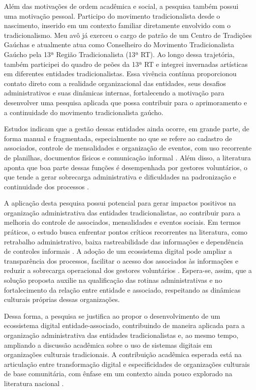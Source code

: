 ﻿\documentclass[12pt,a4paper]{article}
\begin{document}
Além das motivações de ordem acadêmica e social, a pesquisa também possui uma motivação pessoal. Participo do movimento tradicionalista desde o nascimento, inserido em um contexto familiar diretamente envolvido com o tradicionalismo. Meu avô já exerceu o cargo de patrão de um Centro de Tradições Gaúchas e atualmente atua como Conselheiro do Movimento Tradicionalista Gaúcho pela 13ª Região Tradicionalista (13ª RT). Ao longo dessa trajetória, também participei do quadro de peões da 13ª RT e integrei invernadas artísticas em diferentes entidades tradicionalistas. Essa vivência contínua proporcionou contato direto com a realidade organizacional das entidades, seus desafios administrativos e suas dinâmicas internas, fortalecendo a motivação para desenvolver uma pesquisa aplicada que possa contribuir para o aprimoramento e a continuidade do movimento tradicionalista gaúcho.

Estudos indicam que a gestão dessas entidades ainda ocorre, em grande parte, de forma manual e fragmentada, especialmente no que se refere ao cadastro de associados, controle de mensalidades e organização de eventos, com uso recorrente de planilhas, documentos físicos e comunicação informal \citep{jardim2022,silvaalbarello2024}. Além disso, a literatura aponta que boa parte dessas funções é desempenhada por gestores voluntários, o que tende a gerar sobrecarga administrativa e dificuldades na padronização e continuidade dos processos \citep{uliana2019,fabricio2019}.

A aplicação desta pesquisa possui potencial para gerar impactos positivos na organização administrativa das entidades tradicionalistas, ao contribuir para a melhoria do controle de associados, mensalidades e eventos sociais. Em termos práticos, o estudo busca enfrentar pontos críticos recorrentes na literatura, como retrabalho administrativo, baixa rastreabilidade das informações e dependência de controles informais \citep{jardim2022,silvaalbarello2024}. A adoção de um ecossistema digital pode ampliar a transparência dos processos, facilitar o acesso dos associados às informações e reduzir a sobrecarga operacional dos gestores voluntários \citep{uliana2019,fabricio2019}. Espera-se, assim, que a solução proposta auxilie na qualificação das rotinas administrativas e no fortalecimento da relação entre entidade e associado, respeitando as dinâmicas culturais próprias dessas organizações.

Dessa forma, a pesquisa se justifica ao propor o desenvolvimento de um ecossistema digital entidade-associado, contribuindo de maneira aplicada para a organização administrativa das entidades tradicionalistas e, ao mesmo tempo, ampliando a discussão acadêmica sobre o uso de sistemas digitais em organizações culturais tradicionais. A contribuição acadêmica esperada está na articulação entre transformação digital e especificidades de organizações culturais de base comunitária, com ênfase em um contexto ainda pouco explorado na literatura nacional \citep{vial2019,verhoef2021}.
\end{document}
